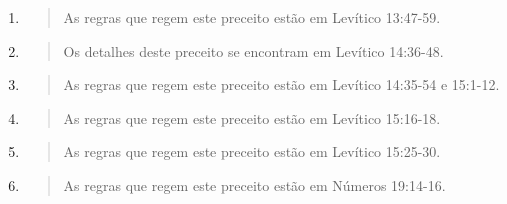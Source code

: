 \begin{enumerate}
\def\labelenumi{\arabic{enumi}.}
\setcounter{enumi}{139}
\item
  \begin{quote}
  As regras que regem este preceito estão em Levítico 13:47-59.
  \end{quote}
\item
  \begin{quote}
  Os detalhes deste preceito se encontram em Levítico 14:36-48.
  \end{quote}
\item
  \begin{quote}
  As regras que regem este preceito estão em Levítico 14:35-54 e
  15:1-12.
  \end{quote}
\item
  \begin{quote}
  As regras que regem este preceito estão em Levítico 15:16-18.
  \end{quote}
\item
  \begin{quote}
  As regras que regem este preceito estão em Levítico 15:25-30.
  \end{quote}
\item
  \begin{quote}
  As regras que regem este preceito estão em Números 19:14-16.
  \end{quote}
\end{enumerate}

